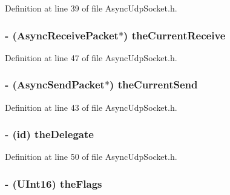Definition at line 39 of file AsyncUdpSocket.h.

\hypertarget{interface_async_udp_socket_a97626f811e3aebe59e2c035cb07fb28b}{
\subsubsection[{theCurrentReceive}]{\setlength{\rightskip}{0pt plus 5cm}-\/ ({\bf AsyncReceivePacket}$\ast$) {\bf theCurrentReceive}}}
\label{interface_async_udp_socket_a97626f811e3aebe59e2c035cb07fb28b}


Definition at line 47 of file AsyncUdpSocket.h.

\hypertarget{interface_async_udp_socket_a670636f2bac217e87ef9840ce30eb5c1}{
\subsubsection[{theCurrentSend}]{\setlength{\rightskip}{0pt plus 5cm}-\/ ({\bf AsyncSendPacket}$\ast$) {\bf theCurrentSend}}}
\label{interface_async_udp_socket_a670636f2bac217e87ef9840ce30eb5c1}


Definition at line 43 of file AsyncUdpSocket.h.

\hypertarget{interface_async_udp_socket_a7e18c4829e83d7de259fa4c4cd78925b}{
\subsubsection[{theDelegate}]{\setlength{\rightskip}{0pt plus 5cm}-\/ (id) {\bf theDelegate}}}
\label{interface_async_udp_socket_a7e18c4829e83d7de259fa4c4cd78925b}


Definition at line 50 of file AsyncUdpSocket.h.

\hypertarget{interface_async_udp_socket_a0870b15c6ba4a8fbd05122ef3994c40e}{
\subsubsection[{theFlags}]{\setlength{\rightskip}{0pt plus 5cm}-\/ (UInt16) {\bf theFlags}}}
\label{interface_async_udp_socket_a0870b15c6ba4a8fbd05122ef3994c40e}


